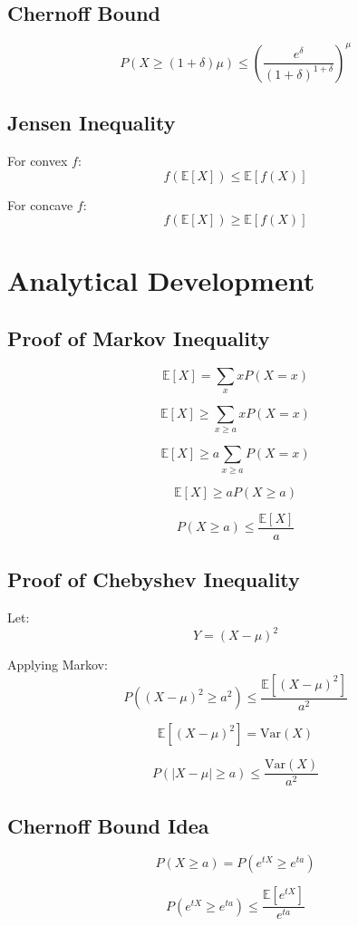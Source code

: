 \documentclass[12pt]{article}
\begin{document}
\subsection{Chernoff Bound}
\[
P(X \ge (1+\delta)\mu) \le \left(\frac{e^\delta}{(1+\delta)^{1+\delta}}\right)^\mu
\]

\subsection{Jensen Inequality}

For convex $f$:
\[
f(\mathbb{E}[X]) \le \mathbb{E}[f(X)]
\]

For concave $f$:
\[
f(\mathbb{E}[X]) \ge \mathbb{E}[f(X)]
\]

\section{Analytical Development}

\subsection{Proof of Markov Inequality}

\[
\mathbb{E}[X] = \sum_x x P(X=x)
\]

\[
\mathbb{E}[X] \ge \sum_{x \ge a} x P(X=x)
\]

\[
\mathbb{E}[X] \ge a \sum_{x \ge a} P(X=x)
\]

\[
\mathbb{E}[X] \ge a P(X \ge a)
\]

\[
P(X \ge a) \le \frac{\mathbb{E}[X]}{a}
\]

\subsection{Proof of Chebyshev Inequality}

Let:
\[
Y = (X - \mu)^2
\]

Applying Markov:
\[
P((X-\mu)^2 \ge a^2) \le \frac{\mathbb{E}[(X-\mu)^2]}{a^2}
\]

\[
\mathbb{E}[(X-\mu)^2] = \mathrm{Var}(X)
\]

\[
P(|X-\mu| \ge a) \le \frac{\mathrm{Var}(X)}{a^2}
\]

\subsection{Chernoff Bound Idea}

\[
P(X \ge a) = P(e^{tX} \ge e^{ta})
\]

\[
P(e^{tX} \ge e^{ta}) \le \frac{\mathbb{E}[e^{tX}]}{e^{ta}}
\]
\end{document}
